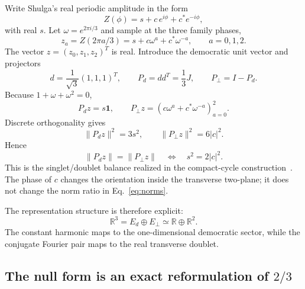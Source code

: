 \documentclass[aps,twocolumn,superscriptaddress,nofootinbib,floatfix]{revtex4-2}
\newcommand{\one}{\bm 1}
\newcommand{\Pd}{P_d}
\newcommand{\Pp}{P_\perp}
\newcommand{\R}{\mathbb{R}}
\begin{document}
Write Shulga's real periodic amplitude in the form
\begin{equation}
Z(\phi)=s+c\,e^{i\phi}+c^*e^{-i\phi},
\label{eq:Z}
\end{equation}
with real $s$. Let $\omega=e^{2\pi i/3}$ and sample at the three family phases,
\begin{equation}
z_a=Z(2\pi a/3)=s+c\omega^a+c^*\omega^{-a},
\qquad a=0,1,2.
\label{eq:samples}
\end{equation}
The vector $z=(z_0,z_1,z_2)^T$ is real. Introduce the democratic unit vector and projectors
\begin{equation}
d=\frac1{\sqrt3}(1,1,1)^T,
\qquad
\Pd=dd^T=\frac13J,
\qquad
\Pp=I-\Pd.
\end{equation}
Because $1+\omega+\omega^2=0$,
\begin{equation}
\Pd z=s\one,
\qquad
\Pp z=(c\omega^a+c^*\omega^{-a})_{a=0}^2.
\end{equation}
Discrete orthogonality gives
\begin{equation}
\|\Pd z\|^2=3s^2,
\qquad
\|\Pp z\|^2=6|c|^2.
\label{eq:norms}
\end{equation}
Hence
\begin{equation}
\boxed{
\|\Pd z\|=\|\Pp z\|
\quad\Longleftrightarrow\quad
s^2=2|c|^2 .}
\label{eq:balance}
\end{equation}
This is the singlet/doublet balance realized in the compact-cycle construction~\cite{Shulga2026}. The phase of $c$ changes the orientation inside the transverse two-plane; it does not change the norm ratio in Eq.~\eqref{eq:norms}.

The representation structure is therefore explicit:
\begin{equation}
\R^3=E_d\oplus E_\perp\simeq\R\oplus\R^2.
\label{eq:split}
\end{equation}
The constant harmonic maps to the one-dimensional democratic sector, while the conjugate Fourier pair maps to the real transverse doublet.

\subsection{The null form is an exact reformulation of $2/3$}
\end{document}
